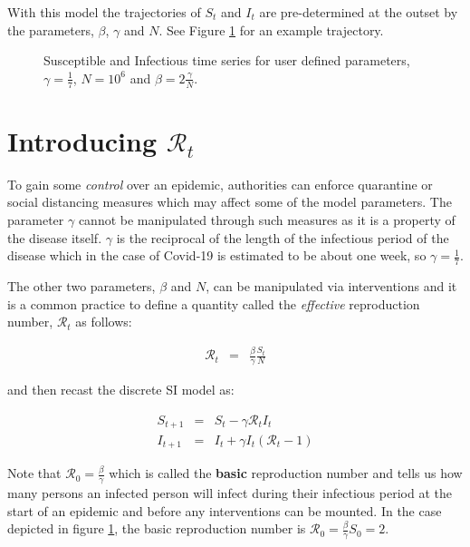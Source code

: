 \documentclass[11pt]{article}
\begin{document}
With this model the trajectories of $S_t$ and $I_t$ are pre-determined at the outset by
the parameters, $\beta$, $\gamma$ and $N$. See Figure \ref{fig1} for an
example trajectory.

\begin{figure}[ht]
\begin{center}
\end{center}
\caption{Susceptible and Infectious time series
for user defined parameters, $\gamma = \frac{1}{7}$, $N=10^6$ and $\beta = 2 \frac{\gamma}{N}$.
}  
\label{fig1}
\end{figure}

\section{Introducing $\mathcal{R}_t$}

To gain some {\it control} over an epidemic, authorities can enforce quarantine or
social distancing measures which may affect some of the model parameters.
The parameter $\gamma$ cannot be manipulated through such measures as it
is a property of the disease itself.
$\gamma$ is the reciprocal of the length of the infectious period of the disease 
which in the case of Covid-19 is estimated to be about one week, so $\gamma = \frac{1}{7}$.

The other two parameters, $\beta$ and $N$, can be manipulated via interventions
and it is a common practice to define a quantity called the {\it effective} reproduction number, 
$\mathcal{R}_t$ as follows:

\begin{eqnarray}
\mathcal{R}_{t} & = & \frac{\beta}{\gamma}\frac{S_t}{N} \label{eq2} 
\end{eqnarray}

and then recast the discrete SI model as:

\begin{eqnarray}
S_{t+1} & = & S_t - \gamma \mathcal{R}_t  I_t \label{eq3a} \\
I_{t+1} & = & I_t +\gamma  I_t ( \mathcal{R}_t - 1 ) \label{eq3b} 
\end{eqnarray}

Note that $ \mathcal{R}_0 = \frac{\beta}{\gamma} $
which is called the {\bf basic} reproduction number and tells us how many
persons an infected person will infect during their infectious period at the
start of an epidemic and before any interventions can be mounted.
In the case depicted in figure \ref{fig1}, the basic reproduction number is
$\mathcal{R}_0 = \frac{\beta}{\gamma} S_0 = 2 $.
\end{document}
